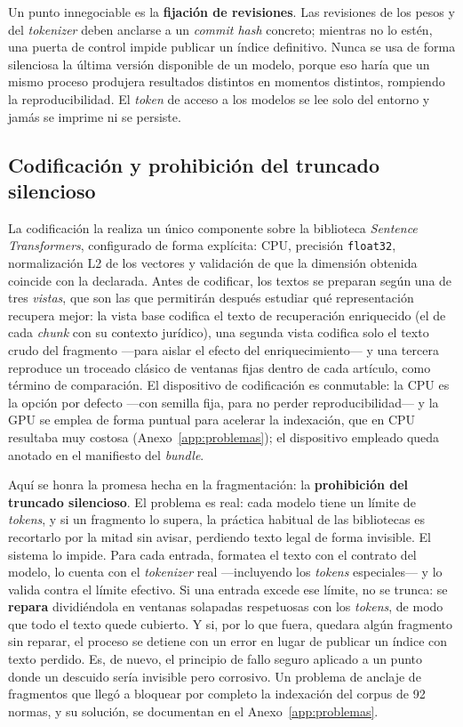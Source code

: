 Un punto innegociable es la \textbf{fijación de revisiones}. Las revisiones de los pesos y del \emph{tokenizer} deben anclarse a un \emph{commit hash} concreto; mientras no lo estén, una puerta de control impide publicar un índice definitivo. Nunca se usa de forma silenciosa la última versión disponible de un modelo, porque eso haría que un mismo proceso produjera resultados distintos en momentos distintos, rompiendo la reproducibilidad. El \emph{token} de acceso a los modelos se lee solo del entorno y jamás se imprime ni se persiste.

\subsection{Codificación y prohibición del truncado silencioso}
\label{subsec:codificacion}

La codificación la realiza un único componente sobre la biblioteca \emph{Sentence Transformers}, configurado de forma explícita: CPU, precisión \texttt{float32}, normalización L2 de los vectores y validación de que la dimensión obtenida coincide con la declarada. Antes de codificar, los textos se preparan según una de tres \emph{vistas}, que son las que permitirán después estudiar qué representación recupera mejor: la vista base codifica el texto de recuperación enriquecido (el de cada \emph{chunk} con su contexto jurídico), una segunda vista codifica solo el texto crudo del fragmento —para aislar el efecto del enriquecimiento— y una tercera reproduce un troceado clásico de ventanas fijas dentro de cada artículo, como término de comparación. El dispositivo de codificación es conmutable: la CPU es la opción por defecto —con semilla fija, para no perder reproducibilidad— y la GPU se emplea de forma puntual para acelerar la indexación, que en CPU resultaba muy costosa (Anexo~\ref{app:problemas}); el dispositivo empleado queda anotado en el manifiesto del \emph{bundle}.

Aquí se honra la promesa hecha en la fragmentación: la \textbf{prohibición del truncado silencioso}. El problema es real: cada modelo tiene un límite de \emph{tokens}, y si un fragmento lo supera, la práctica habitual de las bibliotecas es recortarlo por la mitad sin avisar, perdiendo texto legal de forma invisible. El sistema lo impide. Para cada entrada, formatea el texto con el contrato del modelo, lo cuenta con el \emph{tokenizer} real —incluyendo los \emph{tokens} especiales— y lo valida contra el límite efectivo. Si una entrada excede ese límite, no se trunca: se \textbf{repara} dividiéndola en ventanas solapadas respetuosas con los \emph{tokens}, de modo que todo el texto quede cubierto. Y si, por lo que fuera, quedara algún fragmento sin reparar, el proceso se detiene con un error en lugar de publicar un índice con texto perdido. Es, de nuevo, el principio de fallo seguro aplicado a un punto donde un descuido sería invisible pero corrosivo. Un problema de anclaje de fragmentos que llegó a bloquear por completo la indexación del corpus de 92 normas, y su solución, se documentan en el Anexo~\ref{app:problemas}.

